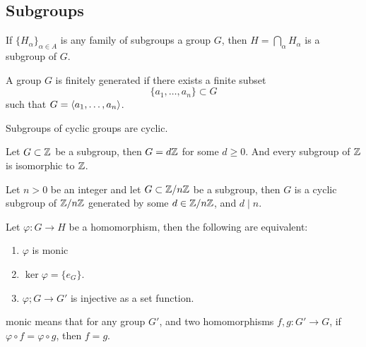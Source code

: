 \subsection{Subgroups}
\begin{prop}
    If $\{H_\alpha\}_{\alpha\in A}$ is any family of subgroups a group $G$, then $H=\bigcap_{\alpha}H_\alpha$ is a subgroup of $G$.
\end{prop}
\begin{defn}
    A group $G$ is finitely generated if there exists a finite subset 
    \begin{equation*}
        \{a_1,\dots, a_n\}\subset G
    \end{equation*}
    such that $G=\langle a_1, \dots, a_n\rangle$.
\end{defn}
\begin{prop}
    Subgroups of cyclic groups are cyclic.
\end{prop}
\begin{prop}
    Let $G\subset\mathbb{Z}$ be a subgroup, then $G=d\mathbb{Z}$ for some $d\geq 0$. And every subgroup of $\mathbb{Z}$ is isomorphic to $\mathbb{Z}$.
\end{prop}
\begin{prop}
    Let $n>0$ be an integer and let $G\subset\mathbb{Z}/n\mathbb{Z}$ be a subgroup, then $G$ is a cyclic subgroup of $\mathbb{Z}/n\mathbb{Z}$ generated by some $d\in\mathbb{Z}/n\mathbb{Z}$, and $d\mid n$.
\end{prop}
\begin{prop}
    Let $\varphi:G\to H$ be a homomorphism, then the following are equivalent:
    \begin{enumerate}
        \item $\varphi$ is monic
        \item $\ker\varphi=\{e_G\}$.
        \item $\varphi; G\to G'$ is injective as a set function.
    \end{enumerate}
    monic means that for any group $G'$, and two homomorphisms $f, g:G'\to G$, if $\varphi\circ f=\varphi\circ g$, then $f=g$. 
\end{prop}
